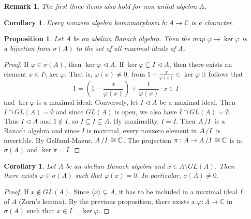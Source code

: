 \documentclass[10pt, a4paper]{article}
\newtheorem{corollary}[thm]{Corollary}
\newtheorem{proposition}[thm]{Proposition}
\newtheorem*{remark}{Remark}
\newenvironment{noticeC}{%
  \tcolorbox[%
  notitle,
  empty,
  enhanced,  %
  breakable,
  coltext=black, 
  fontupper=\rmfamily,
  noparskip,
  sharp corners,
  boxrule=-1pt,  %
  frame hidden,
  left=7pt,  %
  right=7pt,
  top=5pt,
  bottom=5pt,
  before skip=2.5ex plus 2pt,
  after skip=2.5ex plus 2pt,
  overlay unbroken and last={%
  },
  ]}
{\endtcolorbox}
\newenvironment{myproof}%
  {\begin{noticeC}\begin{proof}}%
  {\end{proof}\end{noticeC}}
\newcommand{\C}{\mathbb {C}}
\newcommand{\quot}[2]{{\raisebox{0em}{$#1$}\left/\raisebox{0em}{$#2$}\right.}}
\begin{document}
\begin{remark}
  The first three items also hold for non-unital algebra $A$.
\end{remark}

\begin{corollary}
  Every nonzero algebra homomorphism $h: A \to \C$ is a character.
\end{corollary}

\begin{proposition}
  Let $A$ be an abelian Banach algebra. Then the map $\varphi \mapsto \ker \varphi$
  is a bijection from $\sigma (A)$ to the set of all maximal ideals of $A$.
\end{proposition}

\begin{myproof}
  If $\varphi \in \sigma (A)$, then $\ker \varphi \lhd A$. If $\ker \varphi \subsetneq I \lhd A$, then there exists
  an element $x \in I \setminus \ker \varphi$. That is, $\varphi(x) \neq 0$.
  from $1 - \frac{x}{\varphi(x)} \in \ker \varphi$ it follows that 
  $$1 = \left(1 - \frac{x}{\varphi(x)}\right) + \frac{1}{\varphi(x)} \cdot x \in I$$
  and $\ker \varphi$ is a maximal ideal.
  Conversely, let $I \lhd A$ be a maximal ideal. Then $I \cap GL(A) = \emptyset$
  and since $GL(A)$ is open, we also have $\overline{I} \cap GL(A) = \emptyset$.
  Thus $\overline{I} \lhd A$ and $1 \notin \overline{I}$, so $I \subseteq \overline{I} \subsetneq A$.
  By maximality, $\overline{I} = I$. Then $\quot{A}{I}$ is a Banach algebra and since $I$ is maximal,
  every nonzero element in $\quot{A}{I}$ is invertible. By Gelfand-Mazur, $\quot{A}{I} \cong \C$.
  The projection $\pi: A \to \quot{A}{I} \cong \C$ is in $\sigma (A)$ and $\ker \pi = I$.
\end{myproof}

\begin{corollary}
  Let $A$ be an abelian Banach algebra and $x \in A \setminus GL(A)$.
  Then there exists $\varphi \in \sigma(A)$ such that $\varphi(x) = 0$.
  In particular, $\sigma(A) \neq 0$.
\end{corollary}

\begin{myproof}
  If $x \notin GL(A)$. Since $\langle x \rangle \subsetneq A$, it has to be included in a maximal ideal $I$ of $A$ (Zorn's lemma).
  By the previous proposition, there exists a $\varphi: A \to \C$ in $\sigma (A)$
  such that $x \in I = \ker \varphi$.
\end{myproof}
\end{document}
